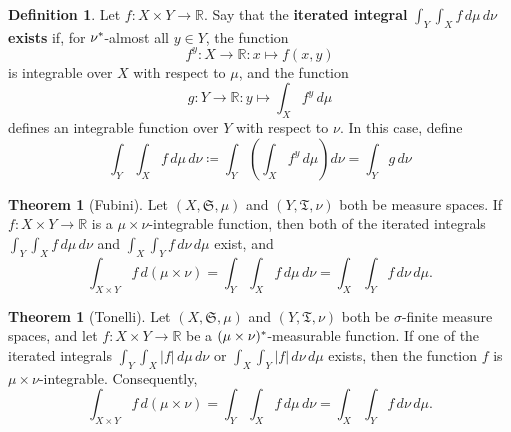 \documentclass[
twoside=true,
paper=letter,
fontsize=9pt,
pagesize=auto,
leqno,
openany,
headsepline,
overfullrule,
]{scrbook}
\theoremstyle{plain}
\theoremstyle{plain}
\theoremstyle{definition}
\newtheorem{defn}[thm]{Definition}
\theoremstyle{bfnoteitalic}
\newtheorem{thmboldnote}[thm]{Theorem}
\theoremstyle{bfnoteroman}
\newcommand{\term}[1]{\textbf{#1}\index{#1}}
\newcommand{\sigalg}[1]{\mathfrak{#1}}
\newcommand{\definedby}{\coloneqq}
\newcommand{\textsigma}{\hbox{\large{$\sigma$}}\kern-1pt}
\newcommand{\abs}[1]{\left\vert#1\right\vert}
\newcommand{\R}{\mathbb{R}}
\newcommand{\semiring}{\sigalg{S}}
\newcommand{\semiringii}{\sigalg{T}}
\newcommand{\kernast}{\ast\kern-1pt}
\newcommand{\function}{f}
\newcommand{\functionii}{g}
\newcommand{\measurespace}{X}
\newcommand{\measurespaceii}{Y}
\newcommand{\mspaceelt}{x}
\newcommand{\mspaceeltii}{y}
\newcommand{\measure}{\mu}
\newcommand{\measureii}{\nu}
\begin{document}
\begin{defn}\label{product_integration}
Let $\function:\measurespace\times\measurespaceii \to \R$. Say that the \term{iterated integral}
$\int_\measurespaceii \int_\measurespace f\,d\measure\, d\measureii$ \textbf{exists}
if, for 
$\measureii^\kernast$-almost all 
$\mspaceeltii\in\measurespaceii$, the function
\[
\function^\mspaceeltii:\measurespace\to\R 
:\mspaceelt\mapsto\function(\mspaceelt,\mspaceeltii)
\]
is integrable over $\measurespace$ with respect to $\measure$, and the function
\[ 
\functionii:
\measurespaceii\to\R:
\mspaceeltii\mapsto 
\int_\measurespace \function^\mspaceeltii\, d\measure 
\]
defines an integrable function over $\measurespaceii$ with respect to $\measureii$. 
In this case, define
\[
\int_\measurespaceii \int_\measurespace f\,d\measure\, d\measureii
\definedby
\int_\measurespaceii 
\left(
\int_\measurespace 
f^\mspaceeltii \,d\measure
\right)
d\measureii
=
\int_\measurespaceii \functionii\, d\measureii
\]
\end{defn}



\begin{thmboldnote}[Fubini]\label{fubini}
Let
$(\measurespace, \semiring, \measure)$
and
$(\measurespaceii, \semiringii, \measureii)$
both be measure spaces.
If $\function:\measurespace\times\measurespaceii\to\R$ is a
$\measure\times\measureii$-integrable function, then both of the iterated integrals
$\int_\measurespaceii\int_\measurespace \function\, d\measure\,d\measureii$ 
and
$\int_\measurespace\int_\measurespaceii \function \, d\measureii\,d\measure$
exist, and
\[
\int_{\measurespace\times\measurespaceii} \function\, d(\measure\times\measureii)
=
\int_\measurespaceii\int_\measurespace \function\, d\measure\, d\measureii
=
\int_\measurespace\int_\measurespaceii \function\, d\measureii\, d\measure.
\]
\end{thmboldnote}



\begin{thmboldnote}[Tonelli]\label{tonelli}
Let 
$(\measurespace, \semiring, \measure)$
and
$(\measurespaceii, \semiringii, \measureii)$
both be \textsigma-finite measure spaces, and let
$\function:\measurespace\times\measurespaceii\to\R$ be a 
$(\measure\times\measureii)^\kernast$\hyp{}measurable function.
If one of the iterated integrals
$\int_\measurespaceii\int_\measurespace \abs{\function} \, d\measure\,d\measureii$ 
or
$\int_\measurespace\int_\measurespaceii \abs{\function} \, d\measureii\,d\measure$
exists, then the function $\function$ is $\measure\times\measureii$-integrable. Consequently, 
\[
\int_{\measurespace\times\measurespaceii} \function\, d(\measure\times\measureii)
=
\int_\measurespaceii\int_\measurespace \function\, d\measure\, d\measureii
=
\int_\measurespace\int_\measurespaceii \function\, d\measureii\, d\measure.
\]
\end{thmboldnote}
\end{document}
